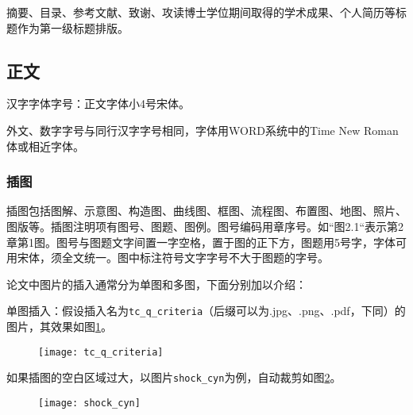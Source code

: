 摘要、目录、参考文献、致谢、攻读博士学位期间取得的学术成果、个人简历等标题作为第一级标题排版。

\subsection{正文}
汉字字体字号：正文字体小4号宋体。

外文、数字字号与同行汉字字号相同，字体用WORD系统中的Time New Roman体或相近字体。

\subsubsection{插图}
插图包括图解、示意图、构造图、曲线图、框图、流程图、布置图、地图、照片、图版等。插图注明项有图号、图题、图例。图号编码用章序号。如“图2.1“表示第2章第1图。图号与图题文字间置一字空格，置于图的正下方，图题用5号字，字体可用宋体，须全文统一。图中标注符号文字字号不大于图题的字号。

论文中图片的插入通常分为单图和多图，下面分别加以介绍：

单图插入：假设插入名为\verb|tc_q_criteria|（后缀可以为.jpg、.png、.pdf，下同）的图片，其效果如图\ref{fig:tc_q_criteria}。
\begin{figure}[!htbp]
    \centering
    \texttt{[image: tc\_q\_criteria]}
    \label{fig:tc_q_criteria}
\end{figure}

如果插图的空白区域过大，以图片\verb|shock_cyn|为例，自动裁剪如图\ref{fig:shock_cyn}。
\begin{figure}[!htbp]
    \centering
    \texttt{[image: shock\_cyn]}
    \label{fig:shock_cyn}
\end{figure}

